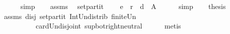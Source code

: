 \begin{isabellebody}
\ \ \ \ \isamarkupfalse%
\ simp\isanewline
\ \ \isamarkupfalse%
\ assms{\isacharparenleft}{\kern0pt}{}{\isacharparenright}{\kern0pt}\ \isamarkupfalse%
\ set{\isacharunderscore}{\kern0pt}partit{\isacharcolon}{\kern0pt}\isanewline
\ \ \ \ {\isachardoublequoteopen}e\ {\isasymunion}\ r\ {\isasymunion}\ d\ {\isacharequal}{\kern0pt}\ A{\isachardoublequoteclose}\isanewline
\ \ \ \ \isamarkupfalse%
\ simp\isanewline
\ \ \isamarkupfalse%
\ {\isacharquery}{\kern0pt}thesis\isanewline
\ \ \ \ \isamarkupfalse%
\ assms\ disj\ set{\isacharunderscore}{\kern0pt}partit\ Int{\isacharunderscore}{\kern0pt}Un{\isacharunderscore}{\kern0pt}distrib{}\ finite{\isacharunderscore}{\kern0pt}Un\isanewline
\ \ \ \ \ \ \ \ \ \ card{\isacharunderscore}{\kern0pt}Un{\isacharunderscore}{\kern0pt}disjoint\ sup{\isacharunderscore}{\kern0pt}bot{\isachardot}{\kern0pt}right{\isacharunderscore}{\kern0pt}neutral\isanewline
\ \ \ \ \isamarkupfalse%
\ metis\isanewline
{}\isamarkupfalse%
%
\endisatagproof
{\isafoldproof}%
%
\isadelimproof
\isanewline
%
\endisadelimproof
%
\isadelimtheory
\isanewline
%
\endisadelimtheory
%
\isatagtheory
{}\isamarkupfalse%
%
\endisatagtheory
{\isafoldtheory}%
%
\isadelimtheory
%
\endisadelimtheory
%
\end{isabellebody}%
\endinput
